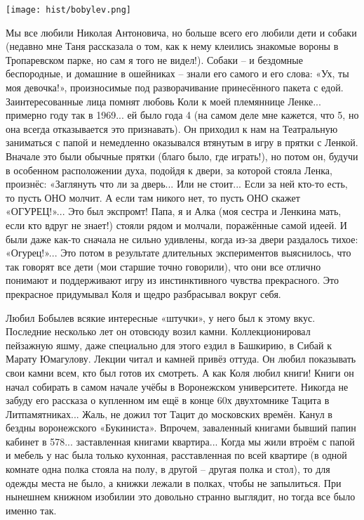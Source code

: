 \begin{center}
	\texttt{[image: hist/bobylev.png]}
\end{center}

Мы все любили Николая Антоновича, но больше всего его любили дети и собаки (недавно мне Таня рассказала о том, как к нему клеились знакомые вороны в Тропаревском парке, но сам я того не видел!). Собаки – и бездомные беспородные, и домашние в ошейниках – знали его самого и его слова: «Ух, ты моя девочка!», произносимые под разворачивание принесённого пакета с едой. Заинтересованные лица помнят любовь Коли к моей племяннице Ленке... примерно году так в 1969... ей было года 4 (на самом деле мне кажется, что 5, но она всегда отказывается это признавать). Он приходил к нам на Театральную заниматься с папой и немедленно оказывался втянутым в игру в прятки с Ленкой. Вначале это были обычные прятки (благо было, где играть!), но потом он, будучи в особенном расположении духа, подойдя к двери, за которой стояла Ленка, произнёс: «Заглянуть что ли за дверь... Или не стоит... Если за ней кто-то есть, то пусть ОНО молчит. А если там никого нет, то пусть ОНО скажет «ОГУРЕЦ!»... Это был экспромт! Папа, я и Алка (моя сестра и Ленкина мать, если кто вдруг не знает!) стояли рядом и молчали, поражённые самой идеей. И были даже как-то сначала не сильно удивлены, когда из-за двери раздалось тихое: «Огурец!»... Это потом в результате длительных экспериментов выяснилось, что так говорят все дети (мои старшие точно говорили), что они все отлично понимают и поддерживают игру из инстинктивного чувства прекрасного. Это прекрасное придумывал Коля и щедро разбрасывал вокруг себя.

Любил Бобылев всякие интересные «штучки», у него
\linebreak
был к этому вкус.
Последние несколько лет он отовсюду возил камни. Коллекционировал пейзажную яшму, даже специально для этого ездил в Башкирию, в Сибай к Марату Юмагулову. Лекции читал и камней привёз оттуда. Он любил показывать свои камни всем, кто был готов их смотреть. А как Коля любил книги! Книги он начал собирать в самом начале учёбы в Воронежском университете. Никогда не забуду его рассказа о купленном им ещё в конце 60х двухтомнике Тацита в Литпамятниках... Жаль, не дожил тот Тацит до московских времён. Канул в бездны воронежского «Букиниста». Впрочем, заваленный книгами бывший папин кабинет в 578... заставленная книгами квартира... Когда мы жили втроём с папой и мебель у нас была только кухонная, расставленная по всей квартире (в одной комнате одна полка стояла на полу, в другой – другая полка и стол), то для одежды места не было, а книжки лежали в полках, чтобы не запылиться. При нынешнем книжном изобилии это довольно странно выглядит, но тогда все было именно так.

